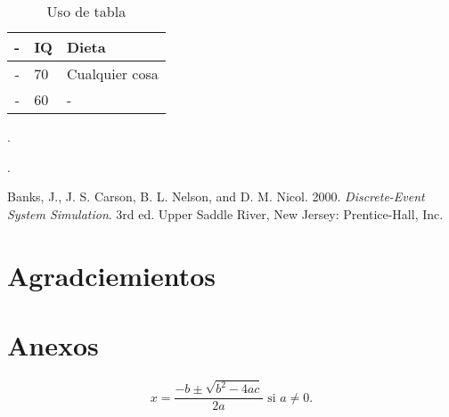 \begin{table}[htb]
\centering
\caption{Uso de tabla\label{tab: first}}
\begin{tabular}{rll}
\hline
-& IQ & Dieta\\ \hline
- & 70 & Cualquier cosa\\
- & 60 &- \\
\hline
\end{tabular}
\end{table}


.
\begin{definition}

\end{definition}

\begin{theorem}

\end{theorem}

\begin{corollary}

\end{corollary}

.



{\footnotesize
\begin{hangref}
\item Banks, J., J. S. Carson, B. L. Nelson, and D. M. Nicol. 2000. \textit{Discrete-Event System Simulation}. 3rd ed. Upper Saddle River, New Jersey: Prentice-Hall, Inc.
\end{hangref}
}










\section*{Agradciemientos}


\appendix

\section{Anexos} \label{app:quadratic}

\begin{equation} \label{eq:quadraticsol}
x = \frac{-b \pm \sqrt{b^2-4ac}}{2a} \mbox{ si } a \ne 0.
\end{equation}




